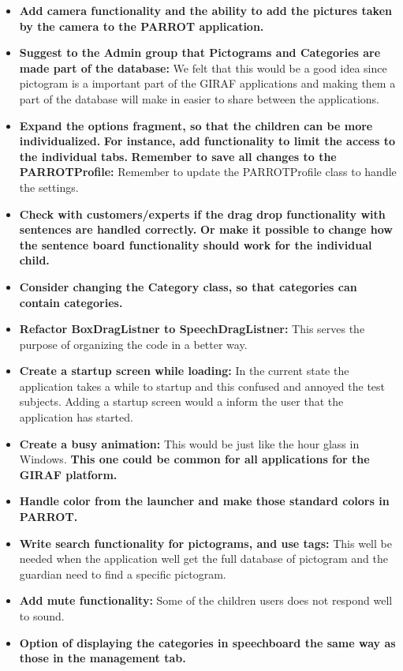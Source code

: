 \begin{itemize}
	\item \textbf{Add camera functionality and the ability to add the pictures taken by the camera to the PARROT application.}
	\item \textbf{Suggest to the Admin group that Pictograms and Categories are made part of the database:} We felt that this would be a 					good idea since pictogram is a important part of the GIRAF applications and making them a part of the database will make in 						easier to share between the applications. 
	\item \textbf{Expand the options fragment, so that the children can be more individualized.}		
		\subitem \textbf{For instance, add functionality to limit the access to the individual tabs.}
		\subitem \textbf{Remember to save all changes to the PARROTProfile:} Remember to update the PARROTProfile class to handle the 										settings.
 		
	\item \textbf{Check with customers/experts if the drag drop functionality with sentences are handled correctly.}
		\subitem \textbf{Or make it possible to change how the sentence board functionality should work for the individual child.}
	\item \textbf{Consider changing the Category class, so that categories can contain categories.}
	
	\item \textbf{Refactor BoxDragListner to SpeechDragListner:} This serves the purpose of organizing the code in a better way.
	\item \textbf{Create a startup screen while loading:} In the current state the application takes a while to startup and this confused 				and annoyed the test subjects. Adding a startup screen would a inform the user that the application has started.
	
	\item \textbf{Create a busy animation:} This would be just like the hour glass in Windows. 
		\subitem \textbf{This one could be common for all applications for the GIRAF platform.}
	\item \textbf{Handle color from the launcher and make those standard colors in PARROT.}
	\item \textbf{Write search functionality for pictograms, and use tags:} This well be needed when the application well get the full 						database of pictogram and the guardian need to find a specific pictogram. 

	\item \textbf{Add mute functionality:} Some of the children users does not respond well to sound.
	
	\item \textbf{Option of displaying the categories in speechboard the same way as those in the management tab.}
	
\end{itemize}  

